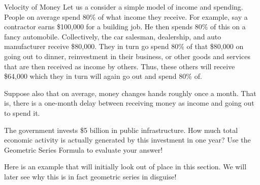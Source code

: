 \begin{exercise}{Velocity of Money \Coffeecup \Coffeecup } Let us a consider a simple model of income and spending.  People on average spend 80\% of what income they receive.  For example, say a contractor earns \$100,000 for a building job.  He then spends 80\% of this on a fancy automobile. Collectively, the car salesman, dealership, and auto manufacturer receive \$80,000.  They in turn go spend 80\% of that \$80,000 on going out to dinner, reinvestment in their business, or other goods and services that are then received as income by others.  Thus, these others will receive \$64,000 which they in turn will again go out and spend 80\% of.  


Suppose also that on average, money changes hands roughly once a month.  That is, there is a one-month delay between receiving money as income and going out to spend it. 


The government invests \$5 billion in public infrastructure.  How much total economic activity is actually generated by this investment in one year? Use the Geometric Series Formula to evaluate your answer!

\end{exercise}

Here is an example that will initially look out of place in this section.  We will later see why this is in fact geometric series in disguise!  

